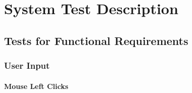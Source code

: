 \documentclass[12pt, titlepage]{article}
\begin{document}
\section{System Test Description}
	
\subsection{Tests for Functional Requirements}

\subsubsection{User Input}
		
\paragraph{Mouse Left Clicks}
\end{document}
